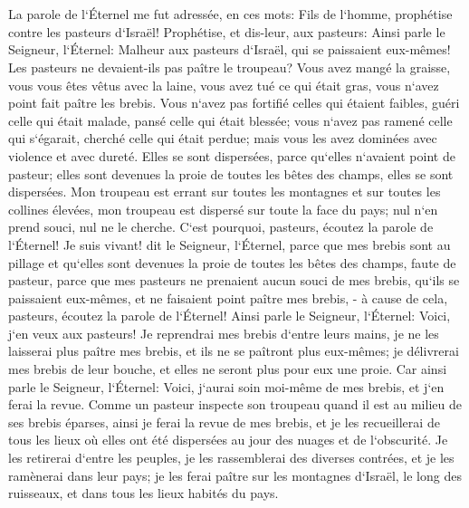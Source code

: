 \chapter{}

\verse La parole de l`Éternel me fut adressée, en ces mots: 
\verse Fils de l`homme, prophétise contre les pasteurs d`Israël! Prophétise, et dis-leur, aux pasteurs: Ainsi parle le Seigneur, l`Éternel: Malheur aux pasteurs d`Israël, qui se paissaient eux-mêmes! Les pasteurs ne devaient-ils pas paître le troupeau? 
\verse Vous avez mangé la graisse, vous vous êtes vêtus avec la laine, vous avez tué ce qui était gras, vous n`avez point fait paître les brebis. 
\verse Vous n`avez pas fortifié celles qui étaient faibles, guéri celle qui était malade, pansé celle qui était blessée; vous n`avez pas ramené celle qui s`égarait, cherché celle qui était perdue; mais vous les avez dominées avec violence et avec dureté. 
\verse Elles se sont dispersées, parce qu`elles n`avaient point de pasteur; elles sont devenues la proie de toutes les bêtes des champs, elles se sont dispersées. 
\verse Mon troupeau est errant sur toutes les montagnes et sur toutes les collines élevées, mon troupeau est dispersé sur toute la face du pays; nul n`en prend souci, nul ne le cherche. 
\verse C`est pourquoi, pasteurs, écoutez la parole de l`Éternel! 
\verse Je suis vivant! dit le Seigneur, l`Éternel, parce que mes brebis sont au pillage et qu`elles sont devenues la proie de toutes les bêtes des champs, faute de pasteur, parce que mes pasteurs ne prenaient aucun souci de mes brebis, qu`ils se paissaient eux-mêmes, et ne faisaient point paître mes brebis, - 
\verse à cause de cela, pasteurs, écoutez la parole de l`Éternel! 
\verse Ainsi parle le Seigneur, l`Éternel: Voici, j`en veux aux pasteurs! Je reprendrai mes brebis d`entre leurs mains, je ne les laisserai plus paître mes brebis, et ils ne se paîtront plus eux-mêmes; je délivrerai mes brebis de leur bouche, et elles ne seront plus pour eux une proie. 
\verse Car ainsi parle le Seigneur, l`Éternel: Voici, j`aurai soin moi-même de mes brebis, et j`en ferai la revue. 
\verse Comme un pasteur inspecte son troupeau quand il est au milieu de ses brebis éparses, ainsi je ferai la revue de mes brebis, et je les recueillerai de tous les lieux où elles ont été dispersées au jour des nuages et de l`obscurité. 
\verse Je les retirerai d`entre les peuples, je les rassemblerai des diverses contrées, et je les ramènerai dans leur pays; je les ferai paître sur les montagnes d`Israël, le long des ruisseaux, et dans tous les lieux habités du pays. 
